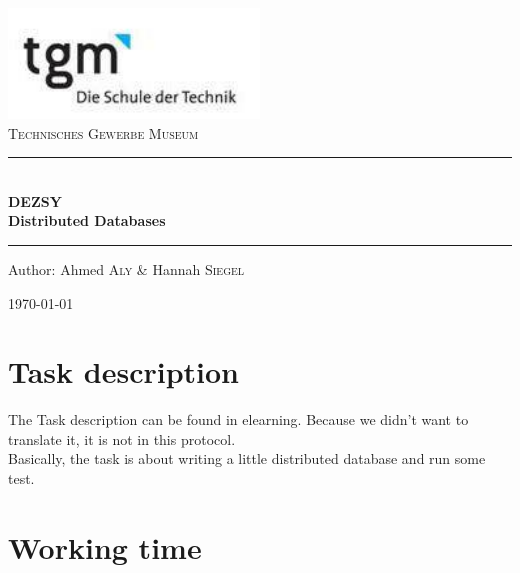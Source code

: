 \documentclass[12pt]{article}
\begin{document}
\begin{titlepage}
\begin{center}
\includegraphics[width=0.5\textwidth]{images/logo}\\[1cm]    

\textsc{\LARGE Technisches Gewerbe Museum}\\[1.5cm]

\rule{12cm}{1mm}
{ \huge \bfseries  \\\large DEZSY\\ \huge Distributed Databases \\[0.4cm] }

\rule{12cm}{1mm}

\noindent 
\vspace{5cm}

\begin{center}
\large
Author: 
Ahmed \textsc{Aly} \&
Hannah \textsc{Siegel}
\end{center}

\vfill

{\large \today}

\end{center}
\end{titlepage}

\tableofcontents

\newpage

\section{Task description}
\label{sec:aufgabenstellung}
The Task description can be found in elearning. Because we didn't want to translate it, it is not in this protocol. \\
Basically, the task is about writing a little distributed database and run some test.
\section{Working time}
\end{document}

